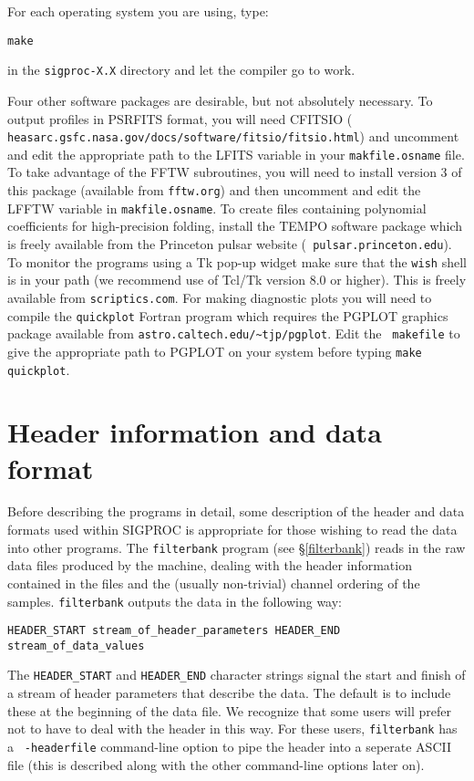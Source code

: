 \documentclass[11pt]{article}
\begin{document}
For each operating system you are using, type:

\noindent
{\tt make}

\noindent in the
{\tt sigproc-X.X} directory
and let the compiler go to work. 

Four other software packages are desirable, but not absolutely
necessary.  To output profiles in PSRFITS format, you will need
CFITSIO ({\tt 
heasarc.gsfc.nasa.gov/docs/software/fitsio/fitsio.html})
and uncomment and edit the appropriate path to the LFITS variable in your
{\tt makfile.osname} file. To take advantage of the FFTW subroutines,
you will need to install version 3 of this package (available from
{\tt fftw.org}) and then uncomment and edit the LFFTW variable in
{\tt makfile.osname}.
To create files containing polynomial coefficients for
high-precision folding, install the {\sc TEMPO} software package which
is freely available from the Princeton pulsar website ({\tt
pulsar.princeton.edu}).  To monitor the programs using a Tk
pop-up widget make sure that the {\tt wish} shell is in your path (we
recommend use of Tcl/Tk version 8.0 or higher). This is freely
available from {\tt scriptics.com}. For making diagnostic
plots you will need to compile the {\tt quickplot} Fortran program which
requires the {\sc PGPLOT} graphics package available from 
\verb+astro.caltech.edu/~tjp/pgplot+. Edit the {\tt
makefile} to give the appropriate path to {\sc PGPLOT} on your system
before typing {\tt make quickplot}.

\section{Header information and data format}
\label{dataformat}
Before describing the programs in detail, some description of the
header and data formats used within SIGPROC is appropriate for those
wishing to read the data into other programs.  The {\tt filterbank}
program (see \S \ref{filterbank}) reads in the raw data files produced
by the machine, dealing with the header information contained in the
files and the (usually non-trivial) channel ordering of the
samples. {\tt filterbank} outputs the data in the following way:
\begin{verbatim}
HEADER_START stream_of_header_parameters HEADER_END stream_of_data_values
\end{verbatim}
The \verb+HEADER_START+ and \verb+HEADER_END+ character strings
signal the start and
finish of a stream of header parameters that describe the data.  The
default is to include these at the beginning of the data file.  We
recognize that some users will prefer not to have to deal with the
header in this way. For these users, {\tt filterbank} has a {\tt
-headerfile} command-line option to pipe the header into a seperate
ASCII file (this is described along with the other command-line
options later on).
\end{document}
